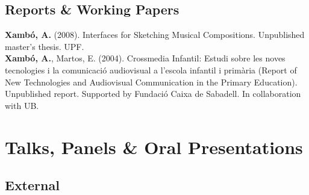 \documentclass[10pt, a4paper]{article}
\newcommand{\years}[1]{\marginnote{\scriptsize #1}}
\begin{document}
\subsection*{Reports \& Working Papers}
\noindent

\years{2008}\textbf{Xambó, A.} (2008). Interfaces for Sketching Musical Compositions. Unpublished master's thesis. UPF.\\ 
\years{2004}\textbf{Xambó, A.}, Martos, E. (2004). Crossmedia Infantil: Estudi sobre les noves tecnologies i la comunicació audiovisual a l'escola infantil i primària (Report of New Technologies and Audiovisual Communication in the Primary Education). Unpublished report. Supported by Fundació Caixa de Sabadell. In collaboration with UB.

\section*{Talks, Panels \& Oral Presentations}
\noindent

\subsection*{External}
\noindent
\end{document}

